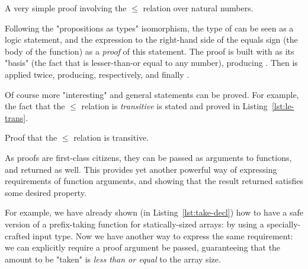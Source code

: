             \begin{listing}[h]
                \caption{A very simple proof involving the $\le$ relation over natural numbers.
                    \label{lst:le-two-four}}
            \end{listing}

            Following the "propositions as types" isomorphism, the type of 
            can be seen as a logic statement, and the expression to the right-hand side of the equals sign
            (the body of the function) as a \emph{proof} of this statement.
            The proof is built with  as its "basis" (the fact that  is
            lesser-than-or equal to any number), producing   .
            Then  is applied twice, producing, respectively,   
            and finally   .

            Of course more "interesting" and general statements can be proved.
            For example, the fact that the $\le$ relation is \emph{transitive} is
            stated and proved in Listing~\ref{lst:le-trans}.

            \begin{listing}[h]
                \caption{Proof that the $\le$ relation is transitive. \label{lst:le-trans}}
            \end{listing}

            As proofs are first-class citizens, they can be passed as arguments to functions,
            and returned as well.
            This provides yet another powerful way of expressing requirements of function arguments,
            and showing that the result returned satisfies some desired property.

            For example, we have already shown (in Listing~\ref{lst:take-decl}) how to have a safe
            version of a prefix-taking function for statically-sized arrays:
            by using a specially-crafted input type.
            Now we have another way to express the same requirement:
            we can explicitly require a proof argument be passed,
            guaranteeing that the amount to be "taken" is \emph{less than or equal} to the array size.

            \begin{center}
            \end{center}

